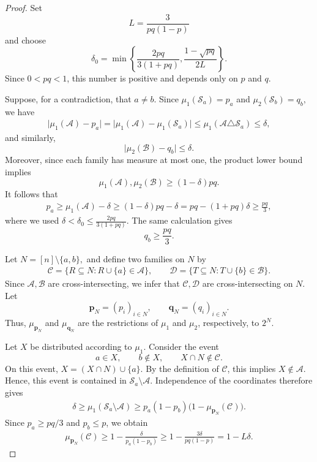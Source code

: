 \documentclass[11pt]{article}
\numberwithin{equation}{section}
\theoremstyle{definition}
\theoremstyle{remark}
\begin{document}
\begin{proof}
Set
$$
L=\frac{3}{pq(1-p)}
$$
and choose
$$
\delta_0
=
\min\left\{
\frac{2pq}{3(1+pq)},
\frac{1-\sqrt{pq}}{2L}
\right\}.
$$
Since $0<pq<1$, this number is positive and depends only on
$p$ and $q$.

Suppose, for a contradiction, that $a\neq b$. Since
$
\mu_1(\mathcal S_a)=p_a
$ 
and
$
\mu_2(\mathcal S_b)=q_b,
$
we have
$$
\begin{aligned}
\bigl|\mu_1(\mathcal A)-p_a\bigr|
=
\bigl|
\mu_1(\mathcal A)-\mu_1(\mathcal S_a)
\bigr|\leq
\mu_1(\mathcal A\triangle\mathcal S_a)
\leq\delta,
\end{aligned}
$$
and similarly,
$$
\bigl|\mu_2(\mathcal B)-q_b\bigr|
\leq
\delta.
$$
Moreover, since each family has measure at most one, the product
lower bound implies
$$
\mu_1(\mathcal A),\mu_2(\mathcal B)
\geq
(1-\delta)pq.
$$
It follows that
$$
\begin{aligned}
p_a
\geq
\mu_1(\mathcal A)-\delta\geq
(1-\delta)pq-\delta=
pq-(1+pq)\delta\geq
\frac{pq}{3},
\end{aligned}
$$
where we used
$
\delta<\delta_0
\leq
\frac{2pq}{3(1+pq)}.
$
The same calculation gives
$$
q_b\geq\frac{pq}{3}.
$$

Let
$
N=[n]\setminus\{a,b\},
$
and define two families on $N$ by
$$
\begin{aligned}
\mathcal C
=
\{R\subseteq N:R\cup\{a\}\in\mathcal A\},\qquad
\mathcal D
=
\{T\subseteq N:T\cup\{b\}\in\mathcal B\}.
\end{aligned}
$$
Since $\mathcal A,\mathcal B$ are cross-intersecting, we infer that
 $\mathcal C,\mathcal D$ are cross-intersecting on $N$. 
Let
$$
\mathbf p_N=(p_i)_{i\in N},
\qquad
\mathbf q_N=(q_i)_{i\in N}.
$$
Thus, $\mu_{\mathbf p_N}$ and $\mu_{\mathbf q_N}$ are the
restrictions of $\mu_1$ and $\mu_2$, respectively, to $2^N$.

Let $X$ be distributed according to $\mu_1$. Consider the event
$$
a\in X,
\qquad
b\notin X,
\qquad
X\cap N\notin\mathcal C.
$$
On this event,
$
X=(X\cap N)\cup\{a\}.
$
By the definition of $\mathcal C$, this implies
$X\notin\mathcal A$. Hence, this event is contained in
$\mathcal S_a\setminus\mathcal A$. Independence of the coordinates
therefore gives
$$
\begin{aligned}
\delta
\geq
\mu_1(\mathcal S_a\setminus\mathcal A)\geq
p_a(1-p_b)
\bigl(1-\mu_{\mathbf p_N}(\mathcal C)\bigr).
\end{aligned}
$$
Since $p_a\geq pq/3$ and $p_b\leq p$, we obtain
$$
\begin{aligned}
\mu_{\mathbf p_N}(\mathcal C)
\geq
1-\frac{\delta}{p_a(1-p_b)}\geq
1-\frac{3\delta}{pq(1-p)}=
1-L\delta.
\end{aligned}
$$


\end{proof}
\end{document}

